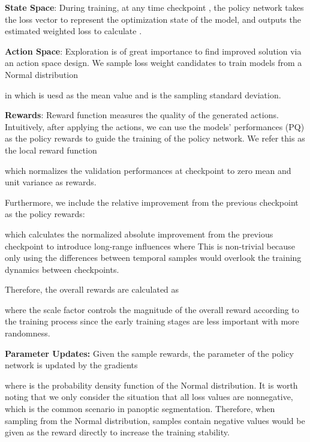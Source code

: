 \documentclass[letterpaper]{article} \usepackage{aaai21}  \usepackage{times}  \usepackage{helvet} \usepackage{courier}  \usepackage[hyphens]{url}  \usepackage{graphicx} \urlstyle{rm} \def\UrlFont{\rm}  \usepackage{natbib}  \usepackage{caption} \frenchspacing  \setlength{\pdfpagewidth}{8.5in}  \setlength{\pdfpageheight}{11in}
\begin{document}
 \textbf{State Space}: 
 During training, at any time checkpoint ,
 the policy network takes the loss vector  to represent the optimization state of the model,
 and outputs the estimated weighted loss 
  to calculate . 
 
 \textbf{Action Space}: Exploration is of great importance to find improved solution via an 
 action space design. We sample loss weight candidates 
  to train  models
 from a Normal distribution 
 
 in which  is uesd as the mean value and 
  is the sampling standard deviation.


 \textbf{Rewards}: Reward function  measures the quality of the generated actions. 
 Intuitively, after applying the actions, we can use the models' performances (PQ) as the 
 policy rewards to guide the training of the policy network. We refer this as the local reward function
 
 which normalizes
 the validation performances  at checkpoint  
 to zero mean and unit variance as rewards.
 
 Furthermore, we include the relative improvement from the previous checkpoint as the policy rewards:
 
 which calculates the normalized absolute improvement from the previous checkpoint to introduce long-range influences
 where 
 This is non-trivial because only using the differences between temporal samples would
  overlook the training dynamics between checkpoints.


 Therefore, the overall rewards are calculated as  
 
where the scale factor  controls the magnitude of the 
 overall reward according to the training process 
 since the early training stages are less important with more randomness.


 \textbf{Parameter Updates:}
 Given the sample rewards, the parameter  of the policy network  is updated by 
 the gradients 
 
 where  is the probability density function of the Normal distribution.
 It is worth noting that we only consider the situation that all loss values are nonnegative,
 which is the common scenario in panoptic segmentation. 
 Therefore, when sampling from the Normal distribution, 
 samples contain negative values would be given  as the reward directly to increase the training stability. 
\end{document}
